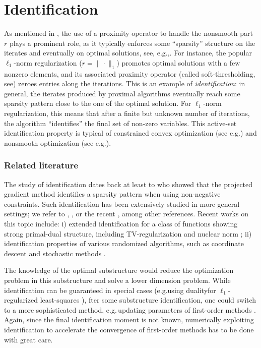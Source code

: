 \section{Identification}\label{sec:basics_identificationn}
As mentioned in \cite{bach2012optimization}, the use of a proximity operator to handle the nonsmooth part $r$ plays a prominent role, as it typically enforces some ``sparsity'' structure on the iterates and eventually on optimal solutions, see, e.g.,\;\cite{vaiter2015model}. For instance, the popular $\ell_1$-norm regularization ($r=\|\cdot\|_1$) promotes optimal solutions with a few nonzero elements, and its associated proximity operator (called soft-thresholding, see\;\cite{donoho1995noising}) zeroes entries along the iterations. This is an example of \emph{identification}: in general, the iterates produced by proximal algorithms eventually reach some sparsity pattern close to the one of the optimal solution. For $\ell_1$-norm regularization, this means that after a finite but unknown number of iterations, the algorithm ``identifies'' the final set of non-zero variables. This active-set identification property is typical of constrained convex optimization (see e.g.\;\cite{wright1993identifiable}) and nonsmooth optimization (see e.g.\;\cite{hare2004identifying}).

\subsubsection{Related literature}
The study of identification dates back at least to \cite{bertsekas1976goldstein} who showed that the projected gradient method identifies a sparsity pattern when using non-negative constraints. Such identification has been extensively studied in more general settings; we refer to \cite{burke1988identification}, \cite{lewis2002active}, \cite{drusvyatskiy2014optimality} or the recent \cite{lewis2018partial}, among other references.
Recent works on this topic include: i) extended identification for a class of functions showing strong primal-dual structure, including TV-regularization and nuclear norm \cite{fadili2018sensitivity}; ii) identification properties of various randomized algorithms, such as coordinate descent \cite{wright2012accelerated} and stochastic methods \cite{poon2018local,fadili2018model,sun2019we}.

The knowledge of the optimal substructure would reduce the optimization problem in this substructure and solve a lower dimension problem. While identification can be guaranteed in special cases  (e.g.\;using duality\;for $\ell_1$-regularized least-squares \cite{ogawa2013safe, fercoq2015mind}), 
%  
fter some substructure identification, one could switch to a more sophisticated method, e.g.\,updating parameters of first-order methods \cite{liang2017activity}.
Again, since the final identification moment is not known, numerically exploiting identification to accelerate the convergence of first-order methods has to be done with great care.

